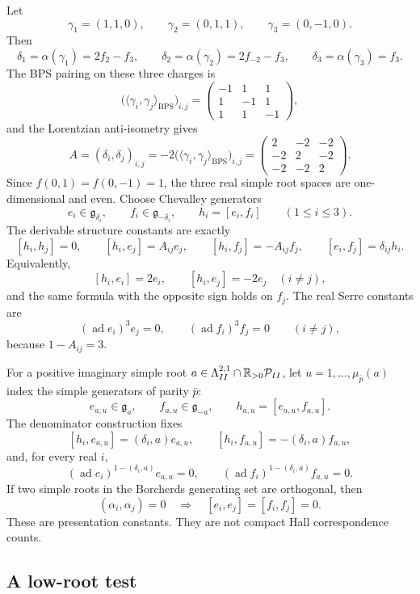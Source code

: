 Let
$$
\gamma_1=(1,1,0),\qquad
\gamma_2=(0,1,1),\qquad
\gamma_3=(0,-1,0).
$$
Then
$$
\delta_1=\alpha(\gamma_1)=2f_2-f_3,\qquad
\delta_2=\alpha(\gamma_2)=2f_{-2}-f_3,\qquad
\delta_3=\alpha(\gamma_3)=f_3.
$$
The BPS pairing on these three charges is
$$
\bigl(\langle\gamma_i,\gamma_j\rangle_{\mathrm{BPS}}\bigr)_{i,j}
=
\begin{pmatrix}
-1&1&1\\
1&-1&1\\
1&1&-1
\end{pmatrix},
$$
and the Lorentzian anti-isometry gives
$$
A=(\delta_i,\delta_j)_{i,j}
=-2\bigl(\langle\gamma_i,\gamma_j\rangle_{\mathrm{BPS}}\bigr)_{i,j}
=
\begin{pmatrix}
2&-2&-2\\
-2&2&-2\\
-2&-2&2
\end{pmatrix}.
$$
Since \(f(0,1)=f(0,-1)=1\), the three real simple root spaces are
one-dimensional and even.  Choose Chevalley generators
$$
e_i\in\mathfrak g_{\delta_i},\qquad
f_i\in\mathfrak g_{-\delta_i},\qquad
h_i=[e_i,f_i]\qquad(1\leq i\leq3).
$$
The derivable structure constants are exactly
$$
[h_i,h_j]=0,\qquad
[h_i,e_j]=A_{ij}e_j,\qquad
[h_i,f_j]=-A_{ij}f_j,\qquad
[e_i,f_j]=\delta_{ij}h_i.
$$
Equivalently,
$$
[h_i,e_i]=2e_i,\qquad
[h_i,e_j]=-2e_j\quad(i\neq j),
$$
and the same formula with the opposite sign holds on \(f_j\).
The real Serre constants are
$$
(\operatorname{ad}e_i)^3e_j=0,\qquad
(\operatorname{ad}f_i)^3f_j=0
\qquad(i\neq j),
$$
because \(1-A_{ij}=3\).

For a positive imaginary simple root \(a\in
\Lambda^{2,1}_{II}\cap\mathbb R_{>0}\mathcal P_{II}\), let
\(u=1,\ldots,\mu_{\bar p}(a)\) index the simple generators of parity
\(\bar p\):
$$
e_{a,u}\in\mathfrak g_a,\qquad
f_{a,u}\in\mathfrak g_{-a},\qquad
h_{a,u}=[e_{a,u},f_{a,u}].
$$
The denominator construction fixes
$$
[h_i,e_{a,u}]=(\delta_i,a)e_{a,u},\qquad
[h_i,f_{a,u}]=-(\delta_i,a)f_{a,u},
$$
and, for every real \(i\),
$$
(\operatorname{ad}e_i)^{1-(\delta_i,a)}e_{a,u}=0,\qquad
(\operatorname{ad}f_i)^{1-(\delta_i,a)}f_{a,u}=0.
$$
If two simple roots in the Borcherds generating set are orthogonal, then
$$
(\alpha_i,\alpha_j)=0
\quad\Longrightarrow\quad
[e_i,e_j]=[f_i,f_j]=0.
$$
These are presentation constants.  They are not compact Hall
correspondence counts.

\subsection{A low-root test}

